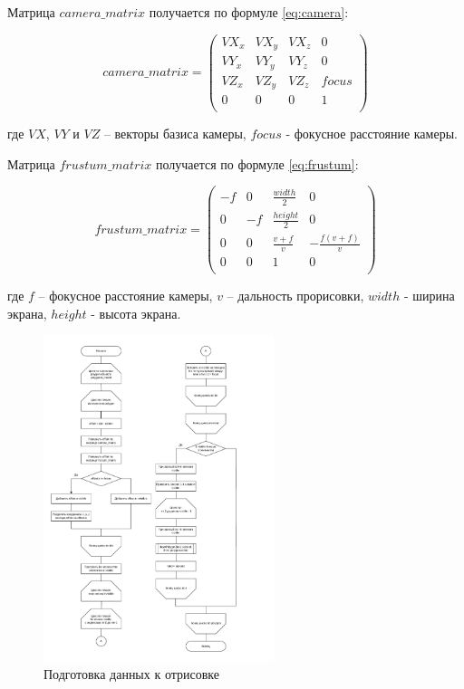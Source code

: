 Матрица $camera\_matrix$ получается по формуле \ref{eq:camera}:

\begin{equation}
	\label{eq:camera}
	camera\_matrix = \begin{pmatrix}
		VX_x & VX_y & VX_z & 0     \\
		VY_x & VY_y & VY_z & 0     \\
		VZ_x & VZ_y & VZ_z & focus \\
		0    & 0    & 0    & 1     \\
	\end{pmatrix}
\end{equation}

\noindent где $VX$, $VY$ и $VZ$ -- векторы базиса камеры, $focus$ - фокусное расстояние камеры.

Матрица $frustum\_matrix$ получается по формуле \ref{eq:frustum}:

\begin{equation}
	\label{eq:frustum}
	frustum\_matrix = \begin{pmatrix}
		-f & 0      & \frac{width}{2}  & 0     \\
		0      & -f & \frac{height}{2} & 0     \\
		0      & 0      & \frac{v + f}{v} & - \frac{f(v + f)}{v}\\
		0      & 0      & 1                & 0     \\
	\end{pmatrix}
\end{equation}

\noindent где $f$ -- фокусное расстояние камеры, $v$ -- дальность прорисовки, $width$ - ширина экрана, $height$ - высота экрана.

\begin{figure}[h!]
	\centering
	\includegraphics[width=0.6\textwidth]{tex_parts/draw.pdf}
	\caption{\label{fig:draw}Подготовка данных к отрисовке}
\end{figure}

